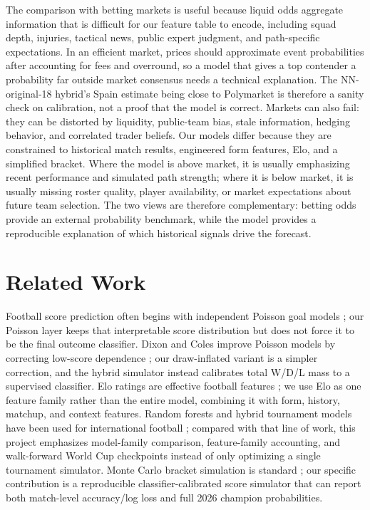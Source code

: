 \documentclass{article}
\begin{document}
The comparison with betting markets is useful because liquid odds aggregate
information that is difficult for our feature table to encode, including squad
depth, injuries, tactical news, public expert judgment, and path-specific
expectations. In an efficient market, prices should approximate event
probabilities after accounting for fees and overround, so a model that gives a
top contender a probability far outside market consensus needs a technical
explanation. The NN-original-18 hybrid's Spain estimate being close to
Polymarket is therefore a sanity check on calibration, not a proof that the model is correct. Markets
can also fail: they can be distorted by liquidity, public-team bias, stale
information, hedging behavior, and correlated trader beliefs. Our models differ
because they are constrained to historical match results, engineered form
features, Elo, and a simplified bracket. Where the model is above market, it is
usually emphasizing recent performance and simulated path strength; where it is
below market, it is usually missing roster quality, player availability, or
market expectations about future team selection. The two views are therefore
complementary: betting odds provide an external probability benchmark, while
the model provides a reproducible explanation of which historical signals drive
the forecast.

\section{Related Work}

Football score prediction often begins with independent Poisson goal models
\citep{maher1982modelling}; our Poisson layer keeps that interpretable score
distribution but does not force it to be the final outcome classifier. Dixon
and Coles improve Poisson models by correcting low-score dependence
\citep{dixon1997modelling}; our draw-inflated variant is a simpler correction,
and the hybrid simulator instead calibrates total W/D/L mass to a supervised
classifier. Elo ratings are effective football features
\citep{hvattum2010using}; we use Elo as one feature family rather than the
entire model, combining it with form, history, matchup, and context features.
Random forests and hybrid tournament models have been used for international
football \citep{schauberger2018predicting,groll2019hybrid}; compared with that
line of work, this project emphasizes model-family comparison, feature-family
accounting, and walk-forward World Cup checkpoints instead of only optimizing a
single tournament simulator. Monte Carlo bracket simulation is standard
\citep{groll2015prediction,fivethirtyeight2022}; our specific contribution is
a reproducible classifier-calibrated score simulator that can report both
match-level accuracy/log loss and full 2026 champion probabilities.
\end{document}
